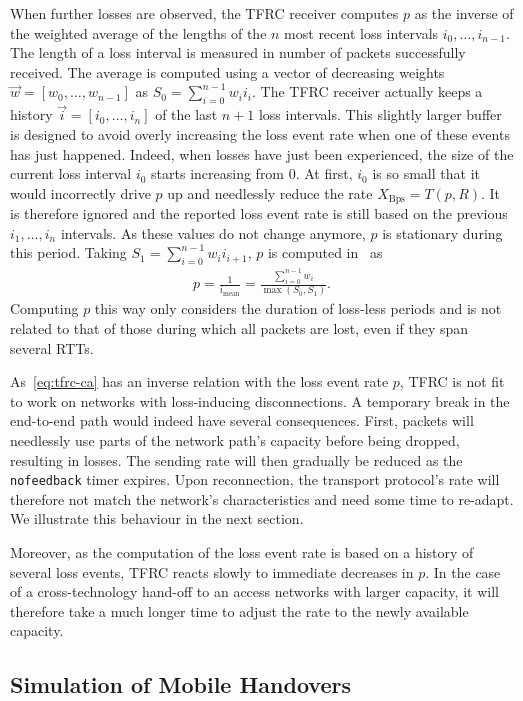 \documentclass[twocolumn]{nictatechreport}
\begin{document}
When further losses are observed, the TFRC receiver computes $p$ as the
inverse of the weighted average of the lengths of the $n$ most recent loss
intervals $i_0,\ldots,i_{n-1}$. The length of a loss interval is measured in
number of packets successfully received. The average is computed using a vector
of decreasing weights $\vec w = [w_0,\ldots,w_{n-1}]$ as $S_0 =
\sum_{i=0}^{n-1}w_ii_i$.  The TFRC receiver actually keeps a history $\vec i =
[i_0,\ldots,i_{n}]$ of the last $n+1$ loss intervals.  This slightly larger
buffer is designed to avoid overly increasing the loss event rate when one of
these events has just happened. Indeed, when losses have just been experienced,
the size of the current loss interval $i_0$ starts increasing from 0. At first,
$i_0$ is so small that it would incorrectly drive $p$ up and needlessly reduce
the rate $X_\mathrm{Bps}=T(p,R)$. It is therefore ignored and the reported loss
event rate is still based on the previous $i_1,\ldots,i_n$ intervals. As these
values do not change anymore, $p$ is stationary during this period.  Taking $S_1
= \sum_{i=0}^{n-1}w_ii_{i+1}$, $p$ is computed in~\cite{rfc5348} as
\begin{gather}
  \label{eq:ImeanP}
  p = \frac1{i_\mathrm{mean}} = \frac{\sum_{i=0}^{n-1}w_i}{\max(S_0, S_1)}.
\end{gather}
Computing $p$ this way only considers the duration of loss-less periods and
is not related to that of those during which all packets are lost,
even if they span several RTTs.

As~\eqref{eq:tfrc-ca} has an inverse relation with the loss event rate $p$, TFRC
is not fit to work on networks with loss-inducing disconnections.  A temporary
break in the end-to-end path would indeed have several consequences.  First,
packets will needlessly use parts of the network path's capacity before being
dropped, resulting in losses. The sending rate will then gradually be reduced as
the \verb#nofeedback# timer expires. Upon reconnection, the transport protocol's
rate will therefore not match the network's characteristics and need some time
to re-adapt. We illustrate this behaviour in the next section.

Moreover, as the computation of the loss event rate is based on a history of
several loss events, TFRC reacts slowly to immediate decreases in $p$. In the
case of a cross-technology hand-off to an access networks with larger capacity,
it will therefore take a much longer time to adjust the rate to the newly
available capacity.

\subsection{Simulation of Mobile Handovers}
\label{sec:freezetfrc-mobile-handovers}
\end{document}
